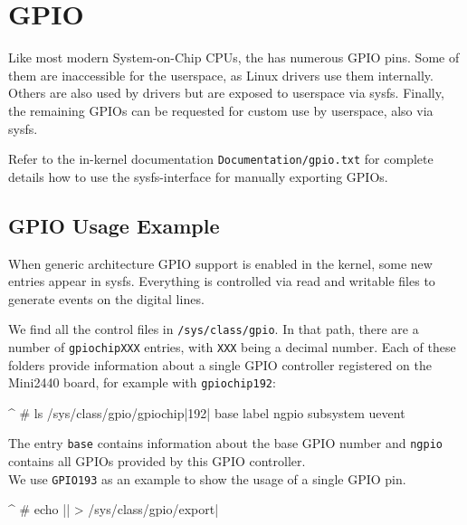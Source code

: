 \newcommand{\perGpioChip}{192}
\newcommand{\perGpioNumber}{193}

\section{GPIO}					\label{sec:GPIO}

Like most modern System-on-Chip CPUs, the \perCpuName{} has numerous GPIO pins.
Some of them are inaccessible for the userspace, as Linux drivers use them
internally. Others are also used by drivers but are exposed to userspace via
sysfs. Finally, the remaining GPIOs can be requested for custom use by
userspace, also via sysfs.

Refer to the in-kernel documentation \texttt{Documentation/gpio.txt} for
complete details how to use the sysfs-interface for manually exporting GPIOs.


\subsection{GPIO Usage Example}		\label{sec:gpioexample}

When generic architecture GPIO support is enabled in the kernel, some new
entries appear in sysfs. Everything is controlled via read and writable
files to generate events on the digital lines.

We find all the control files in \texttt{/sys/class/gpio}. In that path, there are
a number of \texttt{gpiochipXXX} entries, with \texttt{XXX} being a decimal
number. Each of these folders provide information about a single GPIO
controller registered on the Mini2440 board, for example with
\texttt{gpiochip\perGpioChip}:

\begin{ptxshell}[escapechar=|]{^}
# ls /sys/class/gpio/gpiochip|\perGpioChip |
base       label      ngpio      subsystem  uevent
\end{ptxshell}

The entry \texttt{base} contains information about the base GPIO number and
\texttt{ngpio} contains all GPIOs provided by this GPIO controller.\\
We use \texttt{GPIO\perGpioNumber{}} as an example to show the usage of a
single GPIO pin.

\begin{ptxshell}[escapechar=|]{^}
# echo |\ptxshellcmd\perGpioNumber | > /sys/class/gpio/export|
\end{ptxshell}

